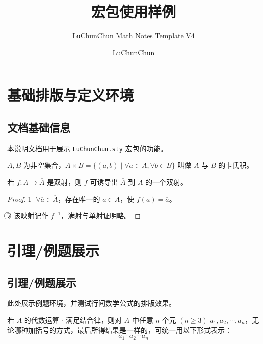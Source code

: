 \documentclass[a4paper,12pt]{ctexart}
\title{宏包使用样例}
\subtitle{LuChunChun Math Notes Template V4}
\author{LuChunChun}
\begin{document}

\makecover %
\makeTOC %


\section{基础排版与定义环境}
\subsection{文档基础信息}
本说明文档用于展示 \texttt{LuChunChun.sty} 宏包的功能。

\begin{定义}[卡氏积]
	$A, B$ 为非空集合，$A \times B = \{(a, b) \mid \forall a \in A, \forall b \in B\}$ 叫做 $A$ 与 $B$ 的卡氏积。
\end{定义}

\begin{定理}[双射诱导]
	若 $f: A \to \overline{A}$ 是双射，则 $f$ 可诱导出 $\overline{A}$ 到 $A$ 的一个双射。
\end{定理}

\begin{proof}
	\textcircled{1} $\forall \overline{a} \in \overline{A}$，存在唯一的 $a \in A$，使 $f(a) = \overline{a}$。
	
	\textcircled{2} 该映射记作 $f^{-1}$，满射与单射证明略。
\end{proof}


\section{引理/例题展示}
\subsection{引理/例题展示}
此处展示例题环境，并测试行间数学公式的排版效果。
\begin{引理}[运算律基础]
	若 $A$ 的代数运算 $\cdot$ 满足结合律，则对 $A$ 中任意 $n$ 个元 $(n \geq 3)$ $a_1, a_2, \cdots, a_n$，无论哪种加括号的方式，最后所得结果是一样的，可统一用以下形式表示：
	$$ a_1 \cdot a_2 \cdots a_n $$
\end{引理}
\end{document}
